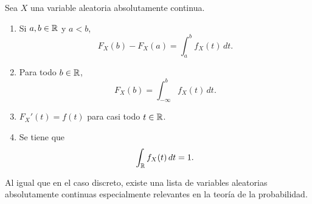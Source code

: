 \documentclass[a4paper, 11pt, extrafontsizes]{memoir}
\begin{document}
\begin{proposition}
    Sea $X$ una variable aleatoria absolutamente continua.
    \begin{enumerate}
        \item Si $a,b \in \mathbb R$ y $a < b$,
        \[F_X(b) - F_X(a) = \int_a^b f_X(t) \, dt.\]
        \item Para todo $b \in \mathbb R$,
        \[F_X(b) = \int_{-\infty}^b f_X(t) \, dt.\]
        \item $F_X'(t) = f(t)$ para casi todo $t \in \mathbb R$.
        \item Se tiene que \[\int_\mathbb R f_X(t) \, dt = 1.\]
    \end{enumerate}
\end{proposition}

Al igual que en el caso discreto, existe una lista de variables aleatorias absolutamente continuas especialmente relevantes en la teoría de la probabilidad. 
\end{document}
